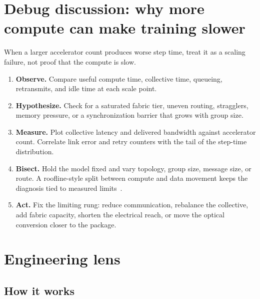 \section{Debug discussion: why more compute can make training slower}

When a larger accelerator count produces worse step time, treat it as a scaling
failure, not proof that the compute is slow.

\begin{enumerate}
\item \textbf{Observe.} Compare useful compute time, collective time, queueing,
      retransmits, and idle time at each scale point.
\item \textbf{Hypothesize.} Check for a saturated fabric tier, uneven routing,
      stragglers, memory pressure, or a synchronization barrier that grows with
      group size.
\item \textbf{Measure.} Plot collective latency and delivered bandwidth against
      accelerator count. Correlate link error and retry counters with the tail of
      the step-time distribution.
\item \textbf{Bisect.} Hold the model fixed and vary topology, group size, message
      size, or route. A roofline-style split between compute and data movement
      keeps the diagnosis tied to measured limits~\cite{roofline}.
\item \textbf{Act.} Fix the limiting rung: reduce communication, rebalance the
      collective, add fabric capacity, shorten the electrical reach, or move the
      optical conversion closer to the package.
\end{enumerate}


\section{Engineering lens}
\label{sec:firstprinciples-engineering-lens}

\subsection{How it works}

